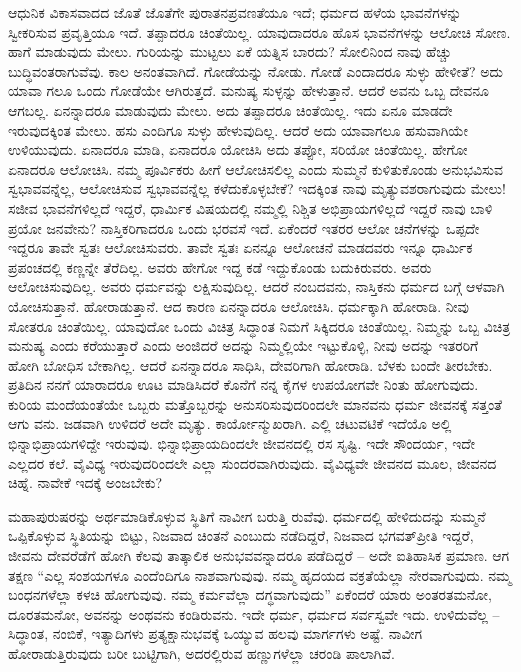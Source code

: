 ಆಧುನಿಕ ವಿಕಾಸವಾದದ ಜೊತೆ ಜೊತೆಗೇ ಪುರಾತನಪ್ರವಣತೆಯೂ  ಇದೆ; ಧರ್ಮದ ಹಳೆಯ ಭಾವನೆಗಳನ್ನು ಸ್ವೀಕರಿಸುವ ಪ್ರವೃತ್ತಿಯೂ ಇದೆ. ತಪ್ಪಾದರೂ ಚಿಂತೆಯಿಲ್ಲ. ಯಾವುದಾದರೂ ಹೊಸ ಭಾವನೆಗಳನ್ನು ಆಲೋಚಿ ಸೋಣ. ಹಾಗೆ ಮಾಡುವುದು ಮೇಲು. ಗುರಿಯನ್ನು ಮುಟ್ಟಲು ಏಕೆ ಯತ್ನಿಸ ಬಾರದು? ಸೋಲಿನಿಂದ ನಾವು ಹೆಚ್ಚು ಬುದ್ಧಿವಂತರಾಗುವೆವು. ಕಾಲ ಅನಂತವಾಗಿದೆ. ಗೋಡೆಯನ್ನು ನೋಡು. ಗೋಡೆ ಎಂದಾದರೂ ಸುಳ್ಳು ಹೇಳೀತೆ? ಅದು ಯಾವಾ ಗಲೂ ಒಂದು ಗೋಡೆಯೇ ಆಗಿರುತ್ತದೆ. ಮನುಷ್ಯ ಸುಳ್ಳನ್ನು ಹೇಳುತ್ತಾನೆ. ಆದರೆ ಅವನು ಒಬ್ಬ ದೇವನೂ ಆಗಬಲ್ಲ. ಏನನ್ನಾದರೂ ಮಾಡುವುದು ಮೇಲು. ಅದು ತಪ್ಪಾದರೂ ಚಿಂತೆಯಿಲ್ಲ. ಇದು ಏನೂ ಮಾಡದೇ ಇರುವುದಕ್ಕಿಂತ ಮೇಲು. ಹಸು ಎಂದಿಗೂ ಸುಳ್ಳು ಹೇಳುವುದಿಲ್ಲ. ಆದರೆ ಅದು ಯಾವಾಗಲೂ ಹಸುವಾಗಿಯೇ ಉಳಿಯುವುದು. ಏನಾದರೂ ಮಾಡಿ, ಏನಾದರೂ ಯೋಚಿಸಿ ಅದು ತಪ್ಪೋ, ಸರಿಯೋ ಚಿಂತೆಯಿಲ್ಲ. ಹೇಗೋ ಏನಾದರೂ ಆಲೋಚಿಸಿ. ನಮ್ಮ ಪೂರ್ವಿಕರು ಹೀಗೆ ಆಲೋಚಿಸಲಿಲ್ಲ ಎಂದು ಸುಮ್ಮನೆ ಕುಳಿತುಕೊಂಡು ಅನುಭವಿಸುವ ಸ್ವಭಾವವನ್ನೆಲ್ಲ, ಆಲೋಚಿಸುವ ಸ್ವಭಾವವನ್ನೆಲ್ಲ ಕಳೆದುಕೊಳ್ಳಬೇಕೆ? ಇದಕ್ಕಿಂತ ನಾವು ಮೃತ್ಯುವಶರಾಗುವುದು ಮೇಲು! ಸಜೀವ ಭಾವನೆಗಳಿಲ್ಲದೆ ಇದ್ದರೆ, ಧಾರ್ಮಿಕ ವಿಷಯದಲ್ಲಿ ನಮ್ಮಲ್ಲಿ ನಿಶ್ಚಿತ ಅಭಿಪ್ರಾಯಗಳಿಲ್ಲದೆ ಇದ್ದರೆ ನಾವು ಬಾಳಿ ಪ್ರಯೋ ಜನವೇನು? ನಾಸ್ತಿಕರಿಗಾದರೂ ಒಂದು ಭರವಸೆ ಇದೆ. ಏಕೆಂದರೆ ಇತರರ ಆಲೋ ಚನೆಗಳನ್ನು ಒಪ್ಪದೇ ಇದ್ದರೂ ತಾವೇ ಸ್ವತಃ ಆಲೋಚಿಸುವರು. ತಾವೇ ಸ್ವತಃ ಏನನ್ನೂ ಆಲೋಚನೆ ಮಾಡದವರು ಇನ್ನೂ ಧಾರ್ಮಿಕ ಪ್ರಪಂಚದಲ್ಲಿ ಕಣ್ಣನ್ನೇ ತೆರೆದಿಲ್ಲ. ಅವರು ಹೇಗೋ ಇದ್ದ ಕಡೆ ಇದ್ದುಕೊಂಡು ಬದುಕಿರುವರು. ಅವರು ಆಲೋಚಿಸುವುದಿಲ್ಲ. ಅವರು ಧರ್ಮವನ್ನು ಲಕ್ಷಿಸುವುದಿಲ್ಲ. ಆದರೆ ನಂಬದವನು, ನಾಸ್ತಿಕನು ಧರ್ಮದ ಬಗ್ಗೆ ಆಳವಾಗಿ ಯೋಚಿಸುತ್ತಾನೆ. ಹೋರಾಡುತ್ತಾನೆ. ಆದ ಕಾರಣ ಏನನ್ನಾದರೂ ಆಲೋಚಿಸಿ. ಧರ್ಮಕ್ಕಾಗಿ ಹೋರಾಡಿ. ನೀವು ಸೋತರೂ ಚಿಂತೆಯಿಲ್ಲ. ಯಾವುದೋ ಒಂದು ವಿಚಿತ್ರ ಸಿದ್ಧಾಂತ ನಿಮಗೆ ಸಿಕ್ಕಿದರೂ ಚಿಂತೆಯಿಲ್ಲ. ನಿಮ್ಮನ್ನು ಒಬ್ಬ ವಿಚಿತ್ರ ಮನುಷ್ಯ ಎಂದು ಕರೆಯುತ್ತಾರೆ ಎಂದು ಅಂಜಿದರೆ ಅದನ್ನು ನಿಮ್ಮಲ್ಲಿಯೇ ಇಟ್ಟುಕೊಳ್ಳಿ, ನೀವು ಅದನ್ನು ಇತರರಿಗೆ ಹೋಗಿ ಬೋಧಿಸ ಬೇಕಾಗಿಲ್ಲ. ಆದರೆ ಏನನ್ನಾದರೂ ಸಾಧಿಸಿ, ದೇವರಿಗಾಗಿ ಹೋರಾಡಿ. ಬೆಳಕು ಬಂದೇ ತೀರಬೇಕು. ಪ್ರತಿದಿನ ನನಗೆ ಯಾರಾದರೂ ಊಟ ಮಾಡಿಸಿದರೆ ಕೊನೆಗೆ ನನ್ನ ಕೈಗಳ ಉಪಯೋಗವೇ ನಿಂತು ಹೋಗುವುದು. ಕುರಿಯ ಮಂದೆಯಂತೆಯೇ ಒಬ್ಬರು ಮತ್ತೊಬ್ಬರನ್ನು ಅನುಸರಿಸುವುದರಿಂದಲೇ ಮಾನವನು ಧರ್ಮ ಜೀವನಕ್ಕೆ ಸತ್ತಂತೆ ಆಗು ವನು. ಜಡವಾಗಿ ಉಳಿದರೆ ಅದೇ ಮೃತ್ಯು. ಕಾರ್ಯೋನ್ಮುಖರಾಗಿ. ಎಲ್ಲಿ ಚಟುವಟಿಕೆ ಇದೆಯೊ ಅಲ್ಲಿ ಭಿನ್ನಾಭಿಪ್ರಾಯಗಳಿದ್ದೇ ಇರುವುವು. ಭಿನ್ನಾಭಿಪ್ರಾಯದಿಂದಲೇ ಜೀವನದಲ್ಲಿ ರಸ ಸೃಷ್ಟಿ. ಇದೇ ಸೌಂದರ್ಯ, ಇದೇ ಎಲ್ಲದರ ಕಲೆ. ವೈವಿಧ್ಯ ಇರುವುದರಿಂದಲೇ ಎಲ್ಲಾ ಸುಂದರವಾಗಿರುವುದು. ವೈವಿಧ್ಯವೇ ಜೀವನದ ಮೂಲ, ಜೀವನದ ಚಿಹ್ನೆ. ನಾವೇಕೆ ಇದಕ್ಕೆ ಅಂಜಬೇಕು?

ಮಹಾಪುರುಷರನ್ನು ಅರ್ಥಮಾಡಿಕೊಳ್ಳುವ ಸ್ಥಿತಿಗೆ ನಾವೀಗ ಬರುತ್ತಿ ರುವೆವು. ಧರ್ಮದಲ್ಲಿ ಹೇಳಿದುದನ್ನು ಸುಮ್ಮನೆ ಒಪ್ಪಿಕೊಳ್ಳುವ ಸ್ಥಿತಿಯನ್ನು ಬಿಟ್ಟು, ನಿಜವಾದ ಚಿಂತನೆ ಎಂಬುದು ನಡೆದಿದ್ದರೆ, ನಿಜವಾದ ಭಗವತ್​ಪ್ರೀತಿ ಇದ್ದರೆ, ಜೀವನು ದೇವರೆಡೆಗೆ ಹೋಗಿ ಕೆಲವು ತಾತ್ಕಾಲಿಕ ಅನುಭವವನ್ನಾದರೂ ಪಡೆದಿದ್ದರೆ – ಅದೇ ಐತಿಹಾಸಿಕ ಪ್ರಮಾಣ. ಆಗ ತಕ್ಷಣ “ಎಲ್ಲ ಸಂಶಯಗಳೂ ಎಂದೆಂದಿಗೂ ನಾಶವಾಗುವುವು. ನಮ್ಮ ಹೃದಯದ ವಕ್ರತೆಯೆಲ್ಲಾ ನೇರವಾಗುವುದು. ನಮ್ಮ ಬಂಧನಗಳೆಲ್ಲಾ ಕಳಚಿ ಹೋಗುವುವು. ನಮ್ಮ ಕರ್ಮವೆಲ್ಲಾ ದಗ್ಧವಾಗುವುದು” ಏಕೆಂದರೆ ಯಾರು ಅಂತರತಮನೋ, ದೂರತಮನೋ, ಅವನನ್ನು ಅಂಥವನು ಕಂಡಿರುವನು. ಇದೇ ಧರ್ಮ, ಧರ್ಮದ ಸರ್ವಸ್ವವೇ ಇದು. ಉಳಿದುವೆಲ್ಲ – ಸಿದ್ಧಾಂತ, ನಂಬಿಕೆ, ಇತ್ಯಾದಿಗಳು ಪ್ರತ್ಯಕ್ಷಾನುಭವಕ್ಕೆ ಒಯ್ಯುವ ಹಲವು ಮಾರ್ಗಗಳು ಅಷ್ಟೆ. ನಾವೀಗ ಹೋರಾಡುತ್ತಿರುವುದು ಬರೀ ಬುಟ್ಟಿಗಾಗಿ, ಅದರಲ್ಲಿರುವ ಹಣ್ಣುಗಳೆಲ್ಲಾ ಚರಂಡಿ ಪಾಲಾಗಿವೆ.

